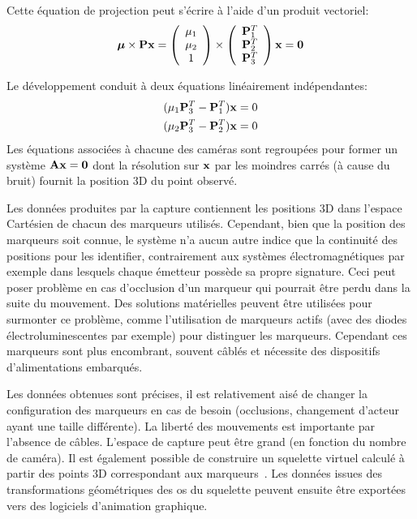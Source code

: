 Cette équation de projection peut s'écrire à l'aide d'un produit vectoriel:
\begin{equation}
  \boldsymbol{\mu} \times \mbf{P} \mbf{x} = 
                        \left( 
			\begin{array}{c} 
			  \mu_1 \\
			  \mu_2 \\
			  1
			\end{array}
			\right) 
			\times 
			\left( 
			\begin{array}{c} 
			  \mbf{P}_1^T \\
			  \mbf{P}_2^T \\
			  \mbf{P}_3^T 
			\end{array} 
			\right)  \mbf{x} = \mbf{0}  
  \label{eq:prodVecProjCam}
\end{equation}

Le développement conduit à deux équations linéairement indépendantes:
\begin{align}
  (\mu_1 \mbf{P}_3^T - \mbf{P}_1^T) \mbf{x} & = 0\\
  (\mu_2 \mbf{P}_3^T - \mbf{P}_2^T) \mbf{x} & = 0\\
  \label{eq:syscam}
\end{align}
Les équations associées à chacune des caméras sont regroupées pour former un système
${\mathbf{A}}{\mathbf{x}} = {\mathbf{0}}$ dont la résolution sur ${\mathbf{x}}$ par les moindres carrés (à cause du bruit)
fournit la position 3D du point observé.

Les données produites par la capture contiennent les positions 3D dans l'espace Cartésien
de chacun des marqueurs utilisés. Cependant, bien que la position
des marqueurs soit connue, le système n'a aucun autre indice que
la continuité des positions pour les identifier, contrairement aux systèmes 
électromagnétiques par exemple dans lesquels chaque émetteur possède sa propre signature.
Ceci peut poser problème en cas d'occlusion d'un marqueur qui pourrait être perdu dans la suite
du mouvement. Des solutions matérielles peuvent être utilisées pour 
surmonter ce problème, comme l'utilisation de marqueurs actifs (avec des diodes électroluminescentes par exemple)
pour distinguer les marqueurs. Cependant ces marqueurs sont plus encombrant,
souvent c\^ablés et nécessite des dispositifs d'alimentations embarqués.

Les données obtenues sont précises, il est relativement aisé de changer la configuration des marqueurs
en cas de besoin (occlusions, changement d'acteur ayant une taille différente).
La liberté des mouvements est importante par l'absence de c\^ables. 
L'espace de capture peut être grand (en fonction du nombre de caméra).
Il est également possible de construire un squelette virtuel calculé à partir des points 3D 
correspondant aux marqueurs~\cite{silaghi98}. Les données issues des
transformations géométriques des os du squelette peuvent ensuite être exportées vers des 
logiciels d'animation graphique.

